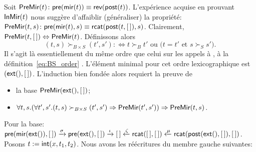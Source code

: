 Soit \(\textsf{PreMir}({t}) \colon \textsf{pre}(\textsf{mir}(t)) \equiv
\textsf{rev}(\textsf{post}(t))\).
L'expérience acquise en prouvant \(\textsf{InMir}({t})\) nous suggère
d'affaiblir (généraliser) la propriété: \(\textsf{PreMir}({t,s}) \colon
\textsf{pre}(\textsf{mir}(t),s) \equiv
\textsf{rcat}(\textsf{post}(t,[\,]),s)\).
Clairement, \(\textsf{PreMir}({t,[\,]}) \Leftrightarrow
\textsf{PreMir}({t})\). Définissons alors
\begin{equation*}
  (t,s) \succ_{B \times S} (t',s') :\Leftrightarrow \text{\(t \succ_{B}
    t'\) ou (\(t = t'\) et \(s \succ_{S} s'\))}.
\end{equation*}
Il s'agit là essentiellement du même ordre que celui sur les appels à
, à la
définition~\eqref{eq:BS_order} . L'élément
minimal pour cet ordre lexicographique est
\((\textsf{ext}(),[\,])\). L'induction bien fondée alors requiert la
preuve de
\begin{itemize}

  \item la base \(\textsf{PreMir}({\textsf{ext}(),[\,]})\);

  \item \(\forall t,s. (\forall t',s'.(t,s) \succ_{B \times S} (t',s')
    \Rightarrow \textsf{PreMir}({t',s'})) \Rightarrow
    \textsf{PreMir}({t,s})\).

\end{itemize}
Pour la base: 
\(\textsf{pre}(\textsf{mir}(\textsf{ext}()),[\,]) \xrightarrow{\smash{\sigma}}
\textsf{pre}(\textsf{ext}(),[\,]) \xrightarrow{\smash{\iota}} [\,]
\xleftarrow{\smash{\zeta}} \textsf{rcat}([\,],[\,])
\xleftarrow{\smash{\mu}}
\textsf{rcat}(\textsf{post}(\textsf{ext}(),[\,]),[\,])\). Posons \(t :=
\textsf{int}(x,t_1,t_2)\). %
Nous avons les réécritures du membre gauche suivantes:
